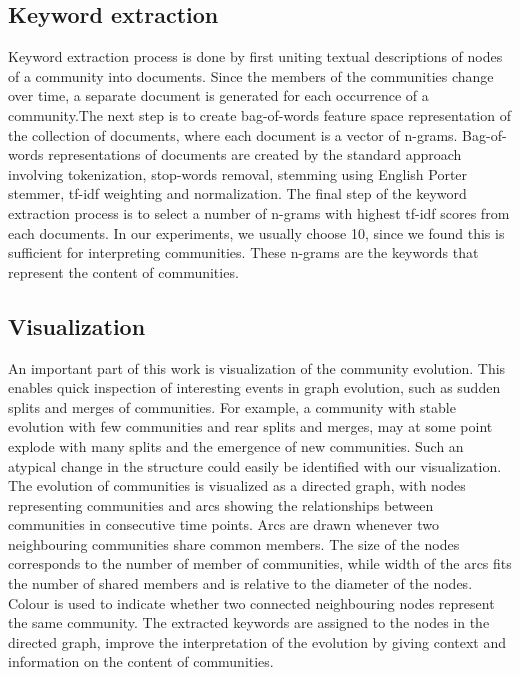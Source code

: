 \documentclass{article} %
\begin{document}
\subsection{Keyword extraction}
Keyword extraction process is done by first uniting textual descriptions of nodes of a community into documents. Since the members of the communities change over time, a separate document is generated for each occurrence of a community.The next step is to create bag-of-words feature space representation of the collection of documents, where each document is a vector of n-grams. Bag-of-words representations of documents are created by the standard approach involving tokenization, stop-words removal, stemming using English Porter stemmer, tf-idf weighting and normalization. The final step of the keyword extraction process is to select a number of n-grams with highest tf-idf scores from each documents.  In our experiments, we usually choose 10, since we found this is sufficient for interpreting communities. These n-grams are the keywords that represent the content of communities.

\subsection{Visualization}
An important part of this work is visualization of the community evolution. This enables quick inspection of  interesting events in graph evolution, such as sudden splits and merges of communities. For example, a community with stable evolution with few communities and rear splits and merges, may at some point explode with many splits and the emergence of new communities. Such  an atypical change in the structure  could easily be identified with our  visualization. The evolution of communities is visualized as a directed graph, with nodes representing communities and arcs showing the relationships between communities in consecutive time points. Arcs are drawn whenever two neighbouring communities share common members. The size of the nodes corresponds to the number of member of communities, while width of the arcs fits the number of shared members and is relative to the diameter of the nodes. Colour is used to indicate whether two connected neighbouring nodes represent the same community. The extracted keywords are assigned to the nodes in the directed graph, improve the interpretation of the evolution by giving context and information on the content of communities.
 
\end{document}
